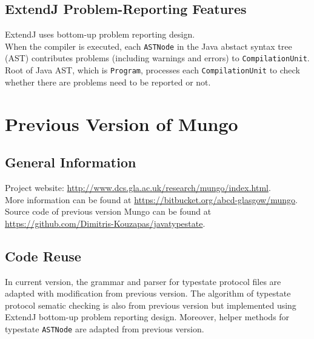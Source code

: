 \documentclass[]{article}
\begin{document}
\subsection{ExtendJ Problem-Reporting Features}
ExtendJ uses bottom-up problem reporting design. \\[0.2cm]
When the compiler is executed, each \texttt{ASTNode} in the Java abstact syntax tree (AST) contributes problems (including warnings and errors) to \texttt{CompilationUnit}. Root of Java AST, which is \texttt{Program}, processes each \texttt{CompilationUnit} to check whether there are problems need to be reported or not.

\section{Previous Version of Mungo}
\subsection{General Information}
Project website: \url{http://www.dcs.gla.ac.uk/research/mungo/index.html}. \\[0.2cm]
More information can be found at \url{https://bitbucket.org/abcd-glasgow/mungo}.\\[0.2cm]
Source code of previous version Mungo can be found at \url{https://github.com/Dimitris-Kouzapas/javatypestate}.

\subsection{Code Reuse}
In current version, the grammar and parser for typestate protocol files are adapted with modification from previous version. The algorithm of typestate protocol sematic checking is also from previous version but implemented using ExtendJ bottom-up problem reporting design. Moreover, helper methods for typestate \texttt{ASTNode} are adapted from previous version.

\end{document}
